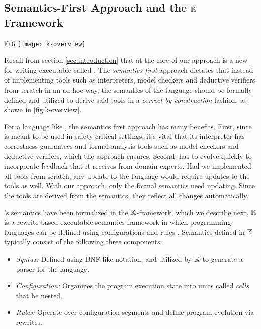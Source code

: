 \subsection{Semantics-First Approach and the $\mathbb{K}$ Framework}\label{subsec:semantics-first-and-k}
\begin{wrapfigure}{l}{0.6\textwidth}
  \centering
  \texttt{[image: k-overview]}
  \caption{\emph{Semantics-first} Approach} \label{fig:k-overview}
\end{wrapfigure}
Recall from section \ref{sec:introduction} that at the core of our approach
is a new \DSL{} for writing executable \BPGs{} called \MediK{}.
The \emph{semantics-first} approach dictates that instead of
implementing tools such as interpreters, model checkers and deductive verifiers
from scratch in an ad-hoc way, the semantics of the language should
be formally defined and utilized to derive said tools in a
\emph{correct-by-construction} fashion, as shown in \figurename{} \ref{fig:k-overview}.

For a language like \MediK{}, the semantics first approach has many benefits. First,
since \MediK{} is meant to be used in safety-critical settings,
it's vital that its interpreter has correctness guarantees and formal analysis
tools such as model checkers and deductive verifiers, which the approach ensures.
Second, \MediK{} has to evolve quickly to incorporate feedback that it receives from domain experts.
Had we implemented all tools from scratch, any update to the language would
require updates to the tools as well. With our approach, only the formal semantics
need updating. Since the tools are derived from the semantics, they reflect all
changes automatically.

\MediK{}'s semantics have been formalized in the $\mathbb{K}{}$-framework, which
we describe next. $\mathbb{K}$ is a rewrite-based executable semantics framework in which
programming languages can be defined
using configurations and rules \cite{KFrameworkURL}. Semantics
defined in $\mathbb{K}$ typically consist of the following three components:
\begin{itemize}
  \item \emph{Syntax:} Defined using BNF-like notation, and utilized
    by $\mathbb{K}{}$ to generate a parser for the language.
  \item \emph{Configuration:} Organizes the program execution state into
    units called \emph{cells} that be nested.
  \item \emph{Rules:} Operate over configuration segments and define
    program evolution via rewrites.
\end{itemize}

